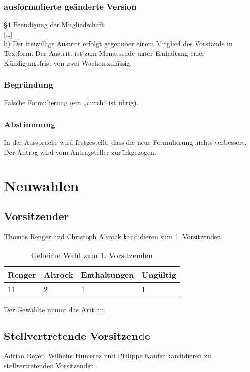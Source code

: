 \documentclass[a4paper]{scrartcl}
\begin{document}
\subsubsection{ausformulierte geänderte Version}

§4 Beendigung der Mitgliedschaft:\\
{[}\dots{]}\\
b) Der freiwillige Austritt erfolgt gegenüber einem Mitglied des Vorstands in Textform. Der Austritt ist zum Monatsende unter Einhaltung einer Kündigungsfrist von zwei Wochen zulässig.

\subsubsection{Begründung}

Falsche Formulierung (ein „durch“ ist übrig).

\subsubsection{Abstimmung}

In der Aussprache wird festgestellt, dass die neue Formulierung nichts verbessert. Der Antrag wird vom Antragsteller zurückgezogen.

\clearpage
\section{Neuwahlen}

\subsection{Vorsitzender}
Thomas Renger und Christoph Altrock kandidieren zum 1. Vorsitzenden.

\begin{table}[h]
	\begin{tabularx}{\textwidth}{XXXX}
		Renger & Altrock & Enthaltungen & Ungültig\\
		\toprule
		11 & 2 & 1 & 1\\
	\end{tabularx}
	\caption{Geheime Wahl zum 1. Vorsitzenden}
\end{table}
Der Gewählte nimmt das Amt an.

\subsection{Stellvertretende Vorsitzende}
Adrian Reyer, Wilhelm Humerez und Philippe Käufer kandidieren zu stellvertretenden Vorsitzenden.
\end{document}
